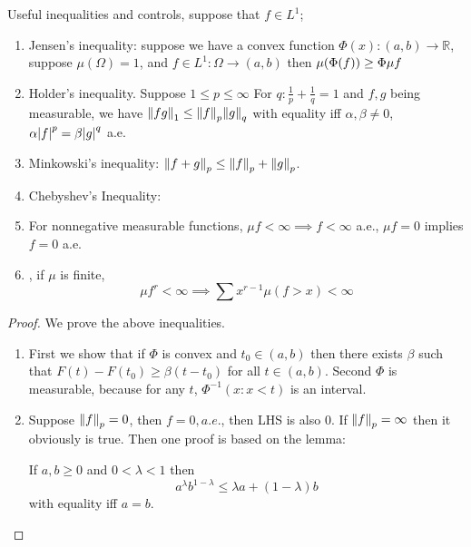 \begin{thm}
    Useful inequalities and controls, suppose that \(f \in L^{1}\);
    \begin{enumerate}
        \item Jensen's inequality: suppose we have a convex function \(\Phi(x): (a,b) \to \mathbb{R}\), suppose \(\mu(\Omega)=1\), and \(f \in L^{1}: \Omega \to (a,b) \) then \(\mu\pqty{\Phi(f)} \geq \Phi \mu f\)
        \item Holder's inequality. Suppose \(1 \leq p \leq \infty\) For \(q: \frac{1}{p} + \frac{1}{q} = 1\) and \(f,g\) being measurable, we have \(\norm{fg}_{1} \leq \norm{f}_{p} \norm{g}_{q}\) with equality iff \(\alpha, \beta \neq 0\), \(\alpha \abs{f}^{p} = \beta \abs{g}^{q}\) a.e. 
        \item Minkowski's inequality: \(\norm{f + g}_{p} \leq \norm{f}_{p} + \norm{g}_{p}\).
        \item Chebyshev's Inequality: 
        \item For nonnegative measurable functions, \(\mu f < \infty  \implies f < \infty\) a.e., \(\mu f = 0\) implies \(f = 0\) a.e. 
        \item {}, if \(\mu\) is finite, 
        \begin{equation*}
            \mu f^{r} < \infty \implies \sum x^{r - 1} \mu(f> x) < \infty
        \end{equation*}
    \end{enumerate}    
\end{thm}

\begin{proof}
    We prove the above inequalities. 
    \begin{enumerate}
        \item First we show that if \(\Phi\) is convex and \(t_{0}\in (a,b)\) then there exists \(\beta\) such that \(F(t) - F(t_{0}) \geq \beta(t-t_{0})\) for all \( t \in (a,b)\).  Second \(\Phi\) is measurable, because for any \(t\), \(\Phi^{-1} ({x: x < t})\) is an interval. 
            
        \item Suppose \(\norm{f}_{p} = 0\), then \(f = 0, a.e.\), then LHS is also \(0\). If \(\norm{f}_{p} = \infty\) then it obviously is true. Then one proof is based on the lemma:
        \begin{lemma}
            If \(a,b \geq 0\) and \(0 < \lambda <1\) then 
            \begin{equation*}
                a^{\lambda} b^{1-\lambda} \leq \lambda a +(1-\lambda) b
            \end{equation*}
            with equality iff \(a = b\). 
        \end{lemma}
    \end{enumerate}
\end{proof}


